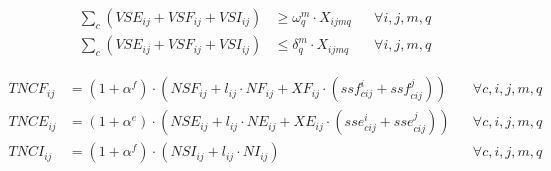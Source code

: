 \begin{align}
    \sum_{c} (VSE_{ij} + VSF_{ij} + VSI_{ij}) 
    &\geq \omega^m_q \cdot X_{ijmq} 
    && \forall i, j, m, q \\
    \sum_{c} (VSE_{ij} + VSF_{ij} + VSI_{ij}) 
    &\leq \delta^m_q \cdot X_{ijmq} 
    && \forall i, j, m, q
\end{align}

\begin{align}
    TNCF_{ij} &= (1+\alpha^f)\cdot(NSF_{ij} + l_{ij} \cdot NF_{ij} + XF_{ij} \cdot (ssf^i_{cij} + ssf^j_{cij})) 
    && \forall c, i, j, m, q \\
    TNCE_{ij} &= (1+\alpha^e)\cdot(NSE_{ij} + l_{ij} \cdot NE_{ij} + XE_{ij} \cdot (sse^i_{cij} + sse^j_{cij})) 
    && \forall c, i, j, m, q \\
    TNCI_{ij} &=(1+\alpha^f)\cdot( NSI_{ij} + l_{ij} \cdot NI_{ij} )
    && \forall c, i, j, m, q
\end{align}


